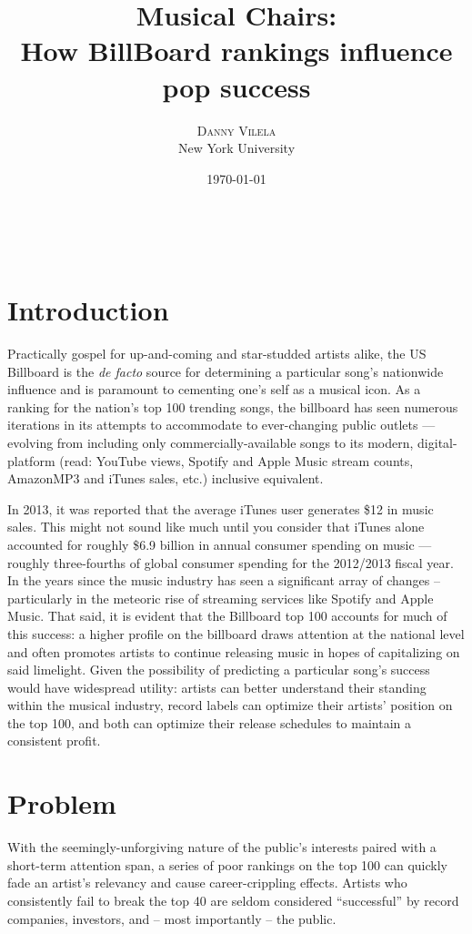 \documentclass[11pt]{article} %
\title{\textbf{Musical Chairs:}\\ 
\vspace*{0.25em} %
How BillBoard rankings influence pop success} %
\author{\textsc{Danny Vilela} %
\\{New York University}} %
\date{\today} %
\makeatletter
\renewcommand{\maketitle}{ %
\begin{flushright} %
{\LARGE\@title} %

\vspace{20pt} %

{\large\@author} %
\\\@date %

\vspace{20pt} %
\end{flushright}
}
\makeatother
\begin{document}
\maketitle %


\section*{Introduction}

Practically gospel for up-and-coming and star-studded artists alike, the US Billboard is the \textit{de facto} source for determining a particular song's nationwide influence and is paramount to cementing one's self as a musical icon. As a ranking for the nation's top 100 trending songs, the billboard has seen numerous iterations in its attempts to accommodate to ever-changing public outlets --- evolving from including only commercially-available songs to its modern, digital-platform (read: YouTube views, Spotify and Apple Music stream counts, AmazonMP3 and iTunes sales, etc.) inclusive equivalent. \par

In 2013, it was reported that the average iTunes user generates \$12 in music sales. This might not sound like much until you consider that iTunes alone accounted for roughly \$6.9 billion in annual consumer spending on music --- roughly three-fourths of global consumer spending for the 2012/2013 fiscal year. In the years since the music industry has seen a significant array of changes -- particularly in the meteoric rise of streaming services like Spotify and Apple Music. That said, it is evident that the Billboard top 100 accounts for much of this success: a higher profile on the billboard draws attention at the national level and often promotes artists to continue releasing music in hopes of capitalizing on said limelight. Given the possibility of predicting a particular song's success would have widespread utility: artists can better understand their standing within the musical industry, record labels can optimize their artists' position on the top 100, and both can optimize their release schedules to maintain a consistent profit. \par

\section*{Problem}
With the seemingly-unforgiving nature of the public's interests paired with a short-term attention span, a series of poor rankings on the top 100 can quickly fade an artist's relevancy and cause career-crippling effects. Artists who consistently fail to break the top 40 are seldom considered ``successful'' by record companies, investors, and -- most importantly -- the public.
\end{document}
